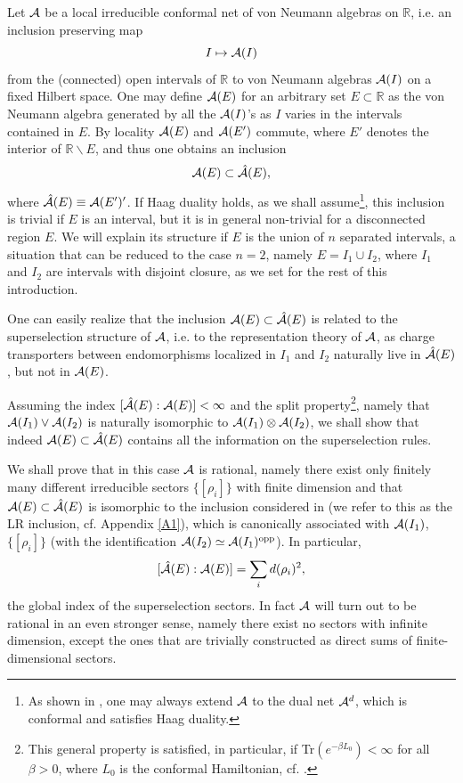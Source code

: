 \documentclass[12pt]{article}
\def\o{{\rm opp}}
\def\setminus{\smallsetminus}
\def\A{{\cal A}}
\def\R{{\mathbb R}}
\begin{document}
Let $\A$ be a local irreducible conformal net of von Neumann algebras on $\R$, i.e. an
inclusion preserving map 
$$
I\mapsto\A(I)
$$
from the (connected) open intervals of $\R$ to von
Neumann algebras $\A(I)$ on a fixed Hilbert space.
One may define $\A(E)$ for an arbitrary set $E\subset\R$ as the
von Neumann algebra generated by all the $\A(I)$'s as $I$ varies in
the intervals contained in $E$. By locality $\A(E)$ and $\A(E')$
commute, where $E'$ denotes the interior of
$\R\setminus E$, and thus one obtains an inclusion
\[
\A(E)\subset\hat\A(E),
\]
where $\hat\A(E)\equiv\A(E')'$. If Haag duality holds,
as we shall assume\footnote{As shown in \cite{GLW},
one may always extend $\A$ to the
dual net $\A^d$, which is conformal and satisfies Haag duality.},
this inclusion is trivial if $E$ is an interval, but it is in general
non-trivial
for a disconnected
region $E$. We will explain its structure if
$E$ is the union of $n$ separated intervals, a situation that can be reduced
to the case $n=2$, namely $E=I_1\cup I_2$, where $I_1$ and $I_2$ are
intervals with disjoint closure, as we set for the rest of this
introduction.

One can easily realize that the inclusion $\A(E)\subset\hat\A(E)$
is related to the superselection structure of $\A$, i.e. to the
representation theory of $\A$, as charge transporters between
endomorphisms localized in $I_1$ and $I_2$ naturally live in
$\hat\A(E)$, but not in $\A(E)$.

Assuming the index $[\hat\A(E):\A(E)]<\infty$ and the split
property\footnote{This general property is satisfied, in particular,
if Tr$(e^{-\beta L_0})<\infty$ for all $\beta>0$, where $L_0$ is the
conformal Hamiltonian, cf. \cite{BDL,DRL}.},
namely that $\A(I_1)\vee\A(I_2)$ is naturally isomorphic to
$\A(I_1)\otimes\A(I_2)$, we shall show that indeed $\A(E)\subset\hat\A(E)$
contains all the information on the superselection rules.

We shall prove that in this case $\A$ is rational, namely there exist
only finitely many different irreducible sectors $\{[\rho_i]\}$ with
finite dimension and that $\A(E)\subset\hat\A(E)$ is isomorphic to the
inclusion considered in \cite{LR} (we refer to this as the LR
inclusion, cf. Appendix \ref{A1}), which is canonically associated with
$\A(I_1)$, $\{[\rho_i]\}$ (with the identification
$\A(I_2)\simeq\A(I_1)^\o$).
In particular,
\[
[\hat\A(E):\A(E)]=\sum_i d(\rho_i)^2,
\]
the global index of the superselection sectors.
In fact $\A$ will turn out to be rational in an even stronger sense,
namely there exist no sectors with infinite dimension, except the
ones that are trivially constructed as
direct sums of finite-dimensional sectors.
\end{document}
